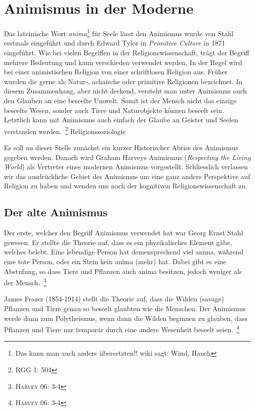 \section{Animismus in der Moderne}
Das lateinische Wort \emph{anima}\footnote{Das kann man auch anders übersetzten!! wiki sagt: Wind, Hauch} für Seele lässt den Animismus wurde von Stahl erstmals eingeführt und durch Edward Tylor in \emph{Primitive Culture} in 1871 eingeführt. Wie bei vielen Begriffen in der Religionswissenschaft, trägt der Begriff mehrere Bedeutung und kann verschieden verwendet werden. In der Regel wird bei einer animistischen Religion von einer schriftlosen Religion aus. Früher wurden die gerne als Natur-, achaische oder primitive Religionen bezeichnet. In diesem Zusammenhang, aber nicht deckend, versteht man unter Animismus auch den Glauben an eine beseelte Umwelt. Somit ist der Mensch nicht das einzige beseelte Wesen, sonder auch Tiere und Naturobjekte können beseelt sein. Letztlich kann mit Animismus auch einfach der Glaube an Geister und Seelen verstanden werden.~\footnote{RGG 1: 504} 
Religionssoziologie

Es soll an dieser Stelle zunächst ein kurzer Historischer Abriss des Animismus gegeben werden. Danach wird Graham Harveys Animismus (\emph{Respecting the Living World}) als Vertreter eines modernen Animismus vorgestellt. Schliesslich verlassen wir das ausdrückliche Gebiet des Animismus um eine ganz andere Perspektive auf Religion zu haben und wenden uns noch der kognitiven Religionswissenschaft zu. 

\subsection{Der alte Animismus}

Der erste, welcher den Begriff Animismus verwendet hat war Georg Ernst Stahl gewesen. Er stellte die Theorie auf, dass es ein physikalisches Element gäbe, welches belebt. Eine lebendige Person hat demensprechend viel anima, während eine tote Person, oder ein Stein kein anima (mehr) hat. Dabei gibt es eine Abstufung, so dass Tiere und Pflanzen auch anima besitzen, jedoch weniger als der Mensch.~\footnote{\textsc{Harvey 06: 3-4}}

James Frazer (1854-1914) stellt die Theorie auf, dass die Wilden (savage) Pflanzen und Tiere genau so beseelt glaubten wie die Menschen. Der Animismus werde dann zum Polytheismus, wenn dann die Wilden beginnen zu glauben, dass Pflanzen und Tiere nur temporär durch eine andere Wesenheit beseelt seien.~\footnote{\textsc{Harvey 06: 3-4}} 

